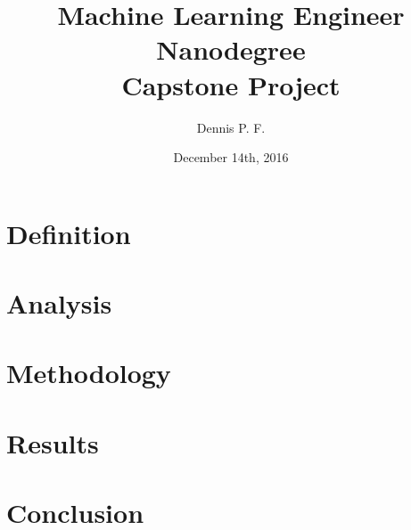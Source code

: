 \documentclass[10pt]{report}
\begin{document}
\title{%
  Machine Learning Engineer Nanodegree \\
  \large Capstone Project}
\author{Dennis P. F.}
\date{December 14th, 2016}
\maketitle

\section{Definition}

\section{Analysis}

\section{Methodology}

\section{Results}

\section{Conclusion}
\end{document}

